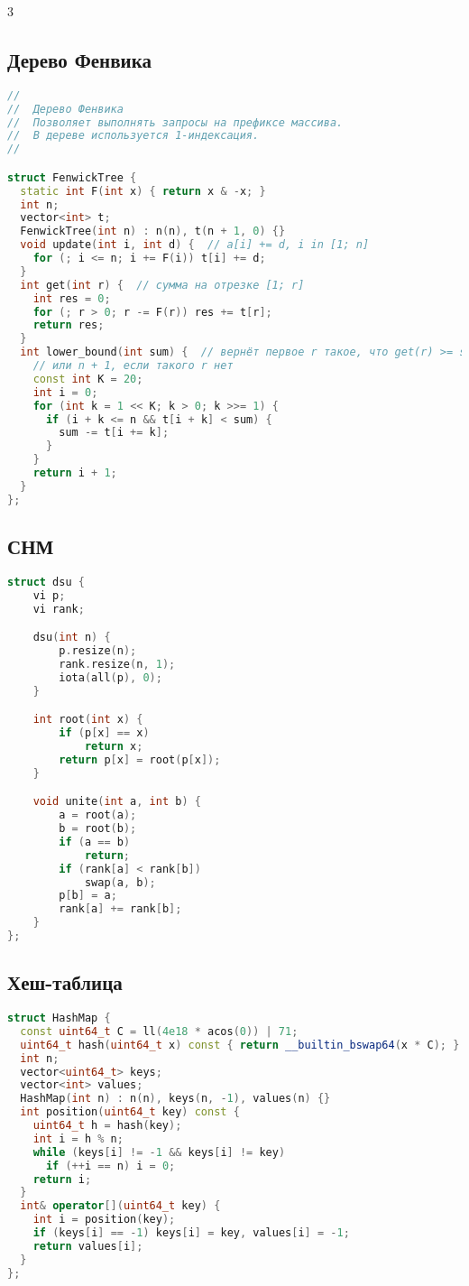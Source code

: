 \documentclass[10pt,a4paper,landscape,twosided]{extarticle}
\begin{document}
\begin{multicols}{3}
\subsection{Дерево Фенвика}
\begin{lstlisting}[language=C++]
//
//  Дерево Фенвика
//  Позволяет выполнять запросы на префиксе массива.
//  В дереве используется 1-индексация.
//

struct FenwickTree {
  static int F(int x) { return x & -x; }
  int n;
  vector<int> t;
  FenwickTree(int n) : n(n), t(n + 1, 0) {}
  void update(int i, int d) {  // a[i] += d, i in [1; n]
    for (; i <= n; i += F(i)) t[i] += d;
  }
  int get(int r) {  // сумма на отрезке [1; r]
    int res = 0;
    for (; r > 0; r -= F(r)) res += t[r];
    return res;
  }
  int lower_bound(int sum) {  // вернёт первое r такое, что get(r) >= sum
    // или n + 1, если такого r нет
    const int K = 20;
    int i = 0;
    for (int k = 1 << K; k > 0; k >>= 1) {
      if (i + k <= n && t[i + k] < sum) {
        sum -= t[i += k];
      }
    }
    return i + 1;
  }
};
\end{lstlisting}

\subsection{СНМ}
\begin{lstlisting}[language=C++]
struct dsu {
    vi p;
    vi rank;

    dsu(int n) {
        p.resize(n);
        rank.resize(n, 1);
        iota(all(p), 0);
    }

    int root(int x) {
        if (p[x] == x)
            return x;
        return p[x] = root(p[x]);
    }

    void unite(int a, int b) {
        a = root(a);
        b = root(b);
        if (a == b)
            return;
        if (rank[a] < rank[b])
            swap(a, b);
        p[b] = a;
        rank[a] += rank[b];
    }
};
\end{lstlisting}

\subsection{Хеш-таблица}
\begin{lstlisting}[language=C++]
struct HashMap {
  const uint64_t C = ll(4e18 * acos(0)) | 71;
  uint64_t hash(uint64_t x) const { return __builtin_bswap64(x * C); }
  int n;
  vector<uint64_t> keys;
  vector<int> values;
  HashMap(int n) : n(n), keys(n, -1), values(n) {}
  int position(uint64_t key) const {
    uint64_t h = hash(key);
    int i = h % n;
    while (keys[i] != -1 && keys[i] != key)
      if (++i == n) i = 0;
    return i;
  }
  int& operator[](uint64_t key) {
    int i = position(key);
    if (keys[i] == -1) keys[i] = key, values[i] = -1;
    return values[i];
  }
};
\end{lstlisting}


\end{multicols}
\end{document}
